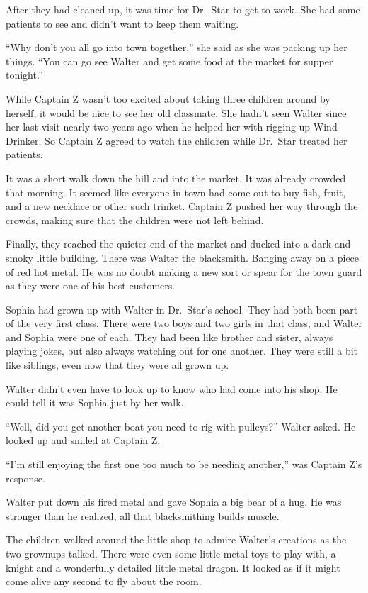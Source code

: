 \documentclass[12pt]{extbook}
\begin{document}
  After they had cleaned up, it was time for Dr.~Star to get to work. She
  had some patients to see and didn't want to keep them waiting.
  
  \enquote{Why don't you all go into town together,} she said as she was
  packing up her things. \enquote{You can go see Walter and get some food
  at the market for supper tonight.}
  
  While Captain Z wasn't too excited about taking three children around by
  herself, it would be nice to see her old classmate. She hadn't seen
  Walter since her last visit nearly two years ago when he helped her with
  rigging up Wind Drinker. So Captain Z agreed to watch the children while
  Dr.~Star treated her patients.
  
  It was a short walk down the hill and into the market. It was already
  crowded that morning. It seemed like everyone in town had come out to
  buy fish, fruit, and a new necklace or other such trinket. Captain Z
  pushed her way through the crowds, making sure that the children were
  not left behind.
  
  Finally, they reached the quieter end of the market and ducked into a
  dark and smoky little building. There was Walter the blacksmith. Banging
  away on a piece of red hot metal. He was no doubt making a new sort or
  spear for the town guard as they were one of his best customers.
  
  Sophia had grown up with Walter in Dr.~Star's school. They had both been
  part of the very first class. There were two boys and two girls in that
  class, and Walter and Sophia were one of each. They had been like
  brother and sister, always playing jokes, but also always watching out
  for one another. They were still a bit like siblings, even now that they
  were all grown up.
  
  Walter didn't even have to look up to know who had come into his shop.
  He could tell it was Sophia just by her walk.
  
  \enquote{Well, did you get another boat you need to rig with pulleys?}
  Walter asked. He looked up and smiled at Captain Z.
  
  \enquote{I'm still enjoying the first one too much to be needing
  another,} was Captain Z's response.
  
  Walter put down his fired metal and gave Sophia a big bear of a hug. He
  was stronger than he realized, all that blacksmithing builds muscle.
  
  The children walked around the little shop to admire Walter's creations
  as the two grownups talked. There were even some little metal toys to
  play with, a knight and a wonderfully detailed little metal dragon. It
  looked as if it might come alive any second to fly about the room.
  
\end{document}
